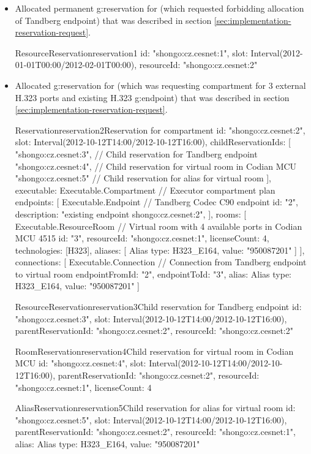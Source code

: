 \begin{itemize}
\item Allocated permanent \gls{g:reservation} for \hyperref[oc:request1]{} (which requested forbidding allocation of Tandberg endpoint) that was described in section \ref{sec:implementation-reservation-request}.
\begin{ObjectCode}{ResourceReservation}{reservation1}{}
id: "shongo:cz.cesnet:1",
slot: Interval(2012-01-01T00:00/2012-02-01T00:00),
resourceId: "shongo:cz.cesnet:2"
\end{ObjectCode}

\item Allocated \gls{g:reservation} for \hyperref[oc:request2]{} (which was requesting compartment for 3 external H.323 ports and existing H.323 \gls{g:endpoint}) that was described in section \ref{sec:implementation-reservation-request}.
\begin{ObjectCode}{Reservation}{reservation2}{Reservation for compartment}
id: "shongo:cz.cesnet:2",
slot: Interval(2012-10-12T14:00/2012-10-12T16:00),
childReservationIds: [
  "shongo:cz.cesnet:3", // Child reservation for Tandberg endpoint 
  "shongo:cz.cesnet:4", // Child reservation for virtual room in Codian MCU
  "shongo:cz.cesnet:5"  // Child reservation for alias for virtual room
],
executable: Executable.Compartment { // Executor compartment plan
  endpoints: [
    Executable.Endpoint { // Tandberg Codec C90 endpoint
      id: "2",
      description: "existing endpoint shongo:cz.cesnet:2",      
    }
  ],
  rooms: [
    Executable.ResourceRoom { // Virtual room with 4 available ports in Codian MCU 4515
      id: "3",
      resourceId: "shongo:cz.cesnet:1",
      licenseCount: 4,
      technologies: [H323],
      aliases: [
        Alias { type: H323_E164, value: "950087201" }
      ]
    }
  ],
  connections: [
    Executable.Connection { // Connection from Tandberg endpoint to virtual room
      endpointFromId: "2", 
      endpointToId: "3",
      alias: Alias { type: H323_E164, value: "950087201" }
    }
  ]
}
\end{ObjectCode}
\begin{ObjectCode}{ResourceReservation}{reservation3}{Child reservation for Tandberg endpoint}
id: "shongo:cz.cesnet:3",
slot: Interval(2012-10-12T14:00/2012-10-12T16:00),
parentReservationId: "shongo:cz.cesnet:2",
resourceId: "shongo:cz.cesnet:2"
\end{ObjectCode}
\begin{ObjectCode}{RoomReservation}{reservation4}{Child reservation for virtual room in Codian MCU}
id: "shongo:cz.cesnet:4",
slot: Interval(2012-10-12T14:00/2012-10-12T16:00),
parentReservationId: "shongo:cz.cesnet:2",
resourceId: "shongo:cz.cesnet:1",
licenseCount: 4
\end{ObjectCode}
\begin{ObjectCode}{AliasReservation}{reservation5}{Child reservation for alias for virtual room}
id: "shongo:cz.cesnet:5",
slot: Interval(2012-10-12T14:00/2012-10-12T16:00),
parentReservationId: "shongo:cz.cesnet:2",
resourceId: "shongo:cz.cesnet:1",
alias: Alias { type: H323_E164, value: "950087201" }
\end{ObjectCode}


\end{itemize}

